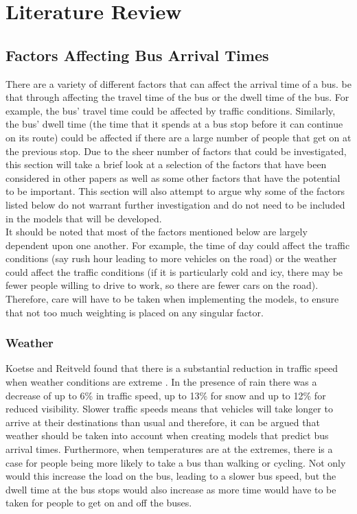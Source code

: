 \section{Literature Review}

\subsection{Factors Affecting Bus Arrival Times}
\label{factors-affecting-arrival-times}

There are a variety of different factors that can affect the arrival time of a bus. be that through affecting the travel time of the bus or the dwell time of the bus. For example, the bus' travel time could be affected by traffic conditions. Similarly, the bus' dwell time (the time that it spends at a bus stop before it can continue on its route) could be affected if there are a large number of people that get on at the previous stop. Due to the sheer number of factors that could be investigated, this section will take a brief look at a selection of the factors that have been considered in other papers as well as some other factors that have the potential to be important. This section will also attempt to argue why some of the factors listed below do not warrant further investigation and do not need to be included in the models that will be developed. \\

It should be noted that most of the factors mentioned below are largely dependent upon one another. For example, the time of day could affect the traffic conditions (say rush hour leading to more vehicles on the road) or the weather could affect the traffic conditions (if it is particularly cold and icy, there may be fewer people willing to drive to work, so there are fewer cars on the road). Therefore, care will have to be taken when implementing the models, to ensure that not too much weighting is placed on any singular factor.

\subsubsection{Weather}
\label{weather}
Koetse and Reitveld found that there is a substantial reduction in traffic speed when weather conditions are extreme \cite{weather-transport-effect}. In the presence of rain there was a decrease of up to 6\% in traffic speed, up to 13\% for snow and up to 12\% for reduced visibility. Slower traffic speeds means that vehicles will take longer to arrive at their destinations than usual and therefore, it can be argued that weather should be taken into account when creating models that predict bus arrival times. Furthermore, when temperatures are at the extremes, there is a case for people being more likely to take a bus than walking or cycling. Not only would this increase the load on the bus, leading to a slower bus speed, but the dwell time at the bus stops would also increase as more time would have to be taken for people to get on and off the buses. \\

